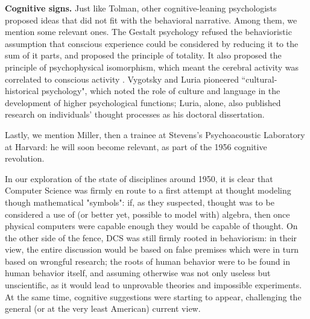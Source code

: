 \documentclass[../main.tex]{subfiles}
\begin{document}
\vspace{4pt}
\textbf{Cognitive signs.}
Just like Tolman, other cognitive-leaning psychologists proposed ideas that did not fit with the behavioral narrative. Among them, we mention some relevant ones. The Gestalt psychology refused the behavioristic assumption that conscious experience could be considered by reducing it to the sum of it parts, and proposed the principle of totality. It also proposed the principle of psychophysical isomorphism, which meant the cerebral activity was correlated to conscious activity  \parencite{wagemansCenturyGestaltPsychology2012}. Vygotsky and Luria pioneered ``cultural-historical psychology", which noted the role of culture and language in the development of higher psychological functions; Luria, alone, also published research on individuals' thought processes as his doctoral dissertation.

Lastly, we mention Miller, then a trainee at Stevens's Psychoacoustic Laboratory at Harvard: he will soon become relevant, as part of the 1956 cognitive revolution.

\vspace{4pt}
In our exploration of the state of disciplines around 1950, it is clear that Computer Science was firmly en route to a first attempt at thought modeling though mathematical "symbols": if, as they suspected, thought was to be considered a use of (or better yet, possible to model with) algebra, then once physical computers were capable enough they would be capable of thought. On the other side of the fence, DCS was still firmly rooted in behaviorism: in their view, the entire discussion would be based on false premises which were in turn based on wrongful research; the roots of human behavior were to be found in human behavior itself, and assuming otherwise was not only useless but unscientific, as it would lead to unprovable theories and impossible experiments. At the same time, cognitive suggestions were starting to appear, challenging the general (or at the very least American) current view.
\end{document}
